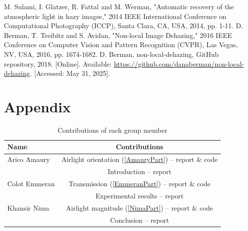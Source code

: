 \documentclass[conference]{IEEEtran}
\begin{document}
\vspace{12pt}

\begin{thebibliography}{00}
 M. Sulami, I. Glatzer, R. Fattal and M. Werman, "Automatic recovery of the atmospheric light in hazy images," 2014 IEEE International Conference on Computational Photography (ICCP), Santa Clara, CA, USA, 2014, pp. 1-11.
 D. Berman, T. Treibitz and S. Avidan, "Non-local Image Dehazing," 2016 IEEE Conference on Computer Vision and Pattern Recognition (CVPR), Las Vegas, NV, USA, 2016, pp. 1674-1682.
D. Berman, non-local-dehazing, GitHub repository, 2018. [Online]. Available: \url{https://github.com/danaberman/non-local-dehazing}. [Accessed: May 31, 2025].
\end{thebibliography}

\section*{Appendix}
\begin{table}[h]
\centering
\caption{Contributions of each group member}
\begin{tabular}{|l|c|}
\hline
\textbf{Name} & \textbf{Contributions} \\
\hline
Arico Amaury & Airlight orientation (\ref{AmauryPart}) -- report \& code \\ 
& Introduction -- report\\
\hline
Colot Emmeran & Transmission (\ref{EmmeranPart}) -- report \& code \\ 
& Experimental results -- report\\
\hline
Khansir Nima & Airlight magnitude (\ref{NimaPart}) -- report \& code \\ 
& Conclusion -- report\\
\hline
\end{tabular}
\end{table}
\end{document}
